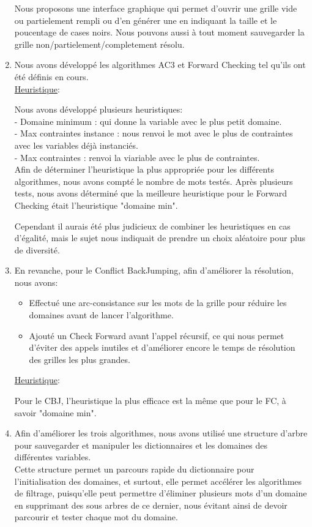 \documentclass[a4paper,12pt]{report}
\begin{document}
\begin{enumerate}
Nous proposons une interface graphique qui permet d'ouvrir une grille vide ou partielement rempli ou d'en générer une en indiquant la taille et le poucentage de cases noirs. Nous pouvons aussi à tout moment sauvegarder la grille non/partielement/completement résolu. \\

\item Nous avons développé les algorithmes AC3 et Forward Checking tel qu'ils ont été définis en cours. \\

\ul{Heuristique}:

Nous avons développé plusieurs heuristiques:\\
 - Domaine minimum : qui donne la variable avec le plus petit domaine.\\
 - Max contraintes instance : nous renvoi le mot avec le plus de contraintes avec les variables déjà instanciés.\\
 - Max contraintes : renvoi la viariable avec le plus de contraintes.\\
 
Afin de déterminer l'heuristique la plus appropriée pour les différents algorithmes, nous avons compté le nombre de mots testés.
Après plusieurs tests, nous avons déterminé que la meilleure heuristique pour le Forward Checking était l'heuristique "domaine min". 

Cependant il aurais été plus judicieux de combiner les heuristiques en cas d'égalité, mais le sujet nous indiquait de prendre un choix aléatoire pour plus de diversité.\\

\item En revanche, pour le Conflict BackJumping, afin d'améliorer la résolution, nous avons:
\begin{itemize}
\item Effectué une arc-consistance sur les mots de la grille pour réduire les domaines avant de lancer l'algorithme.
\item Ajouté un Check Forward avant l'appel récursif, ce qui nous permet d'éviter des appels inutiles et d'améliorer encore le temps de résolution des grilles les plus grandes.\\
\end{itemize}

\ul{Heuristique}:

Pour le CBJ, l'heuristique la plus efficace est la même que pour le FC, à savoir "domaine min".\\

\item Afin d'améliorer les trois algorithmes, nous avons utilisé une structure d'arbre pour sauvegarder et manipuler les dictionnaires et les domaines des différentes variables.\\
 Cette structure permet un parcours rapide du dictionnaire pour l'initialisation des domaines, et surtout, elle permet accélérer les algorithmes de filtrage, puisqu'elle peut permettre d'éliminer plusieurs mots d'un domaine en supprimant des sous arbres de ce dernier, nous évitant ainsi de devoir parcourir et tester chaque mot du domaine.\\
\end{enumerate}
\end{document}
